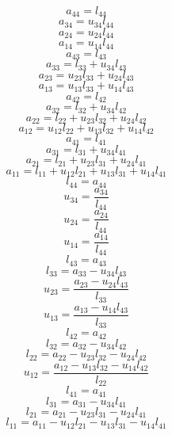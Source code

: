 \documentclass[10pt,a4paper,dvipdfmx]{article}
\begin{document}
\begin{multicols}{2}
$$ a_{{4}{4}} = l_{{4}{4}} $$
$$ a_{{3}{4}} = u_{{3}{4}} l_{{4}{4}} $$
$$ a_{{2}{4}} = u_{{2}{4}} l_{{4}{4}} $$
$$ a_{{1}{4}} = u_{{1}{4}} l_{{4}{4}} $$
$$ a_{{4}{3}} = l_{{4}{3}} $$
$$ a_{{3}{3}} = l_{{3}{3}} + u_{{3}{4}} l_{{4}{3}} $$
$$ a_{{2}{3}} = u_{{2}{3}} l_{{3}{3}} + u_{{2}{4}} l_{{4}{3}} $$
$$ a_{{1}{3}} = u_{{1}{3}} l_{{3}{3}} + u_{{1}{4}} l_{{4}{3}} $$
$$ a_{{4}{2}} = l_{{4}{2}} $$
$$ a_{{3}{2}} = l_{{3}{2}} + u_{{3}{4}} l_{{4}{2}} $$
$$ a_{{2}{2}} = l_{{2}{2}} + u_{{2}{3}} l_{{3}{2}} + u_{{2}{4}} l_{{4}{2}} $$
$$ a_{{1}{2}} = u_{{1}{2}} l_{{2}{2}} + u_{{1}{3}} l_{{3}{2}} + u_{{1}{4}} l_{{4}{2}} $$
$$ a_{{4}{1}} = l_{{4}{1}} $$
$$ a_{{3}{1}} = l_{{3}{1}} + u_{{3}{4}} l_{{4}{1}} $$
$$ a_{{2}{1}} = l_{{2}{1}} + u_{{2}{3}} l_{{3}{1}} + u_{{2}{4}} l_{{4}{1}} $$
$$ a_{{1}{1}} = l_{{1}{1}} + u_{{1}{2}} l_{{2}{1}} + u_{{1}{3}} l_{{3}{1}} + u_{{1}{4}} l_{{4}{1}} $$
\vfill\null
\columnbreak
$$ l_{{4}{4}} = a_{{4}{4}} $$
$$ u_{{3}{4}} = \dfrac{a_{{3}{4}}}{l_{{4}{4}}} $$
$$ u_{{2}{4}} = \dfrac{a_{{2}{4}}}{l_{{4}{4}}} $$
$$ u_{{1}{4}} = \dfrac{a_{{1}{4}}}{l_{{4}{4}}} $$
$$ l_{{4}{3}} = a_{{4}{3}} $$
$$ l_{{3}{3}} = a_{{3}{3}}- u_{{3}{4}} l_{{4}{3}} $$
$$ u_{{2}{3}} = \dfrac{a_{{2}{3}}- u_{{2}{4}} l_{{4}{3}}}{l_{{3}{3}}} $$
$$ u_{{1}{3}} = \dfrac{a_{{1}{3}}- u_{{1}{4}} l_{{4}{3}}}{l_{{3}{3}}} $$
$$ l_{{4}{2}} = a_{{4}{2}} $$
$$ l_{{3}{2}} = a_{{3}{2}}- u_{{3}{4}} l_{{4}{2}} $$
$$ l_{{2}{2}} = a_{{2}{2}}- u_{{2}{3}} l_{{3}{2}}- u_{{2}{4}} l_{{4}{2}} $$
$$ u_{{1}{2}} = \dfrac{a_{{1}{2}}- u_{{1}{3}} l_{{3}{2}}- u_{{1}{4}} l_{{4}{2}}}{l_{{2}{2}}} $$
$$ l_{{4}{1}} = a_{{4}{1}} $$
$$ l_{{3}{1}} = a_{{3}{1}}- u_{{3}{4}} l_{{4}{1}} $$
$$ l_{{2}{1}} = a_{{2}{1}}- u_{{2}{3}} l_{{3}{1}}- u_{{2}{4}} l_{{4}{1}} $$
$$ l_{{1}{1}} = a_{{1}{1}}- u_{{1}{2}} l_{{2}{1}}- u_{{1}{3}} l_{{3}{1}}- u_{{1}{4}} l_{{4}{1}} $$
\end{multicols}
\end{document}

